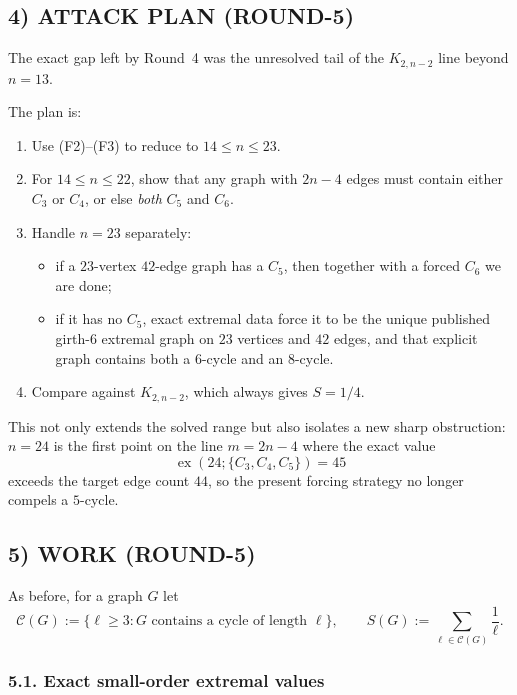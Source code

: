 \subsection*{4) ATTACK PLAN (ROUND-5)}

The exact gap left by Round~4 was the unresolved tail of the $K_{2,n-2}$ line beyond $n=13$.

The plan is:
\begin{enumerate}
\item Use (F2)--(F3) to reduce to $14\le n\le 23$.
\item For $14\le n\le 22$, show that any graph with $2n-4$ edges must contain either $C_3$ or $C_4$, or else \emph{both} $C_5$ and $C_6$.
\item Handle $n=23$ separately:
  \begin{itemize}
  \item if a $23$-vertex $42$-edge graph has a $C_5$, then together with a forced $C_6$ we are done;
  \item if it has no $C_5$, exact extremal data force it to be the unique published girth-$6$ extremal graph on $23$ vertices and $42$ edges, and that explicit graph contains both a $6$-cycle and an $8$-cycle.
  \end{itemize}
\item Compare against $K_{2,n-2}$, which always gives $S=1/4$.
\end{enumerate}

This not only extends the solved range but also isolates a new sharp obstruction: $n=24$ is the first point on the line $m=2n-4$ where the exact value
\[
\operatorname{ex}(24;\{C_3,C_4,C_5\})=45
\]
exceeds the target edge count $44$, so the present forcing strategy no longer compels a $5$-cycle.

\subsection*{5) WORK (ROUND-5)}

As before, for a graph $G$ let
\[
\mathcal C(G):=\{\ell\ge 3:\text{$G$ contains a cycle of length $\ell$}\},
\qquad
S(G):=\sum_{\ell\in\mathcal C(G)}\frac1\ell.
\]

\subsubsection*{5.1. Exact small-order extremal values}

